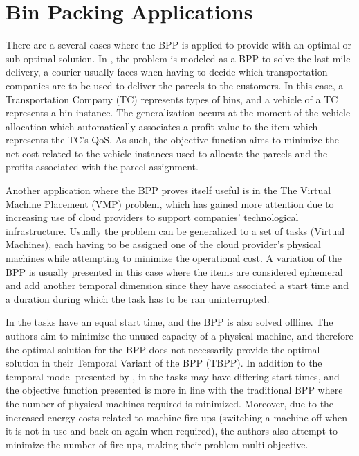 \section{Bin Packing Applications}

There are a several cases where the BPP is applied to provide with an optimal or
sub-optimal solution. In \cite{baldi2019generalized}, the problem is modeled as
a BPP to solve the last mile delivery, a courier usually faces when having to
decide which transportation companies are to be used to deliver the parcels to
the customers. In this case, a Transportation Company (TC) represents types of
bins, and a vehicle of a TC represents a bin instance. The generalization occurs
at the moment of the vehicle allocation which automatically associates a profit
value to the item which represents the TC's QoS. As such, the objective function
aims to minimize the net cost related to the vehicle instances used to allocate
the parcels and the profits associated with the parcel assignment.

Another application where the BPP proves itself useful is in the The Virtual
Machine Placement (VMP) problem, which has gained more attention due to
increasing use of cloud providers to support companies' technological
infrastructure. Usually the problem can be generalized to a set of tasks
(Virtual Machines), each having to be assigned one of the cloud provider's
physical machines while attempting to minimize the operational cost. A variation
of the BPP is usually presented in this case where the items are considered
ephemeral and add another temporal dimension since they have associated a start
time and a duration during which the task has to be ran uninterrupted. 

In \cite{de2016temporal} the tasks have an equal start time, and the BPP is also
solved offline. The authors aim to minimize the unused capacity of a physical
machine, and therefore the optimal solution for the BPP does not necessarily
provide the optimal solution in their Temporal Variant of the BPP (TBPP). In
addition to the temporal model presented by \cite{de2016temporal}, in
\cite{aydin2020multi} the tasks may have differing start times, and the
objective function presented is more in line with the traditional BPP where the
number of physical machines required is minimized. Moreover, due to the
increased energy costs related to machine fire-ups (switching a machine off when
it is not in use and back on again when required), the authors also attempt to
minimize the number of fire-ups, making their problem multi-objective.

